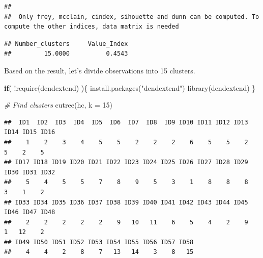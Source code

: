 \documentclass[
]{book}
\newenvironment{Shaded}{\begin{snugshade}}{\end{snugshade}}
\newcommand{\AttributeTok}[1]{\textcolor[rgb]{0.77,0.63,0.00}{#1}}
\newcommand{\CommentTok}[1]{\textcolor[rgb]{0.56,0.35,0.01}{\textit{#1}}}
\newcommand{\ControlFlowTok}[1]{\textcolor[rgb]{0.13,0.29,0.53}{\textbf{#1}}}
\newcommand{\DecValTok}[1]{\textcolor[rgb]{0.00,0.00,0.81}{#1}}
\newcommand{\FunctionTok}[1]{\textcolor[rgb]{0.00,0.00,0.00}{#1}}
\newcommand{\NormalTok}[1]{#1}
\newcommand{\SpecialCharTok}[1]{\textcolor[rgb]{0.00,0.00,0.00}{#1}}
\newcommand{\StringTok}[1]{\textcolor[rgb]{0.31,0.60,0.02}{#1}}
\begin{document}
\begin{verbatim}
## 
##  Only frey, mcclain, cindex, sihouette and dunn can be computed. To compute the other indices, data matrix is needed
\end{verbatim}

\begin{Shaded}
\end{Shaded}

\begin{verbatim}
## Number_clusters     Value_Index 
##         15.0000          0.4543
\end{verbatim}

Based on the result, let's divide observations into 15 clusters.

\begin{Shaded}
\begin{Highlighting}[]
\ControlFlowTok{if}\NormalTok{( }\SpecialCharTok{!}\FunctionTok{require}\NormalTok{(dendextend) )\{}
    \FunctionTok{install.packages}\NormalTok{(}\StringTok{"dendextend"}\NormalTok{)}
    \FunctionTok{library}\NormalTok{(dendextend)}
\NormalTok{\}}

\CommentTok{\# Find clusters}
\FunctionTok{cutree}\NormalTok{(hc, }\AttributeTok{k =} \DecValTok{15}\NormalTok{) }
\end{Highlighting}
\end{Shaded}

\begin{verbatim}
##  ID1  ID2  ID3  ID4  ID5  ID6  ID7  ID8  ID9 ID10 ID11 ID12 ID13 ID14 ID15 ID16 
##    1    2    3    4    5    5    2    2    2    6    5    5    2    5    2    5 
## ID17 ID18 ID19 ID20 ID21 ID22 ID23 ID24 ID25 ID26 ID27 ID28 ID29 ID30 ID31 ID32 
##    5    4    5    5    7    8    9    5    3    1    8    8    8    3    1    2 
## ID33 ID34 ID35 ID36 ID37 ID38 ID39 ID40 ID41 ID42 ID43 ID44 ID45 ID46 ID47 ID48 
##    2    2    2    2    2    9   10   11    6    5    4    2    9    1   12    2 
## ID49 ID50 ID51 ID52 ID53 ID54 ID55 ID56 ID57 ID58 
##    4    4    2    8    7   13   14    3    8   15
\end{verbatim}
\end{document}
